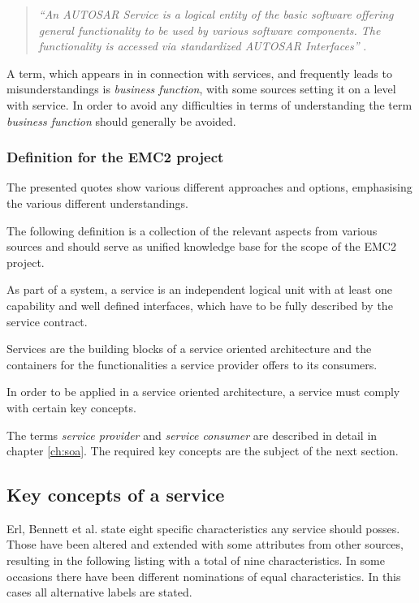 \begin{description}
\begin{quote}
\emph{``An AUTOSAR Service is a logical entity of the basic software offering general functionality to be used by various software components. The functionality is accessed via standardized AUTOSAR Interfaces''} \cite{autosar_glossary}.
\end{quote}

\end{description}

A term, which appears in in connection with services, and frequently leads to misunderstandings is \emph{business function}, with some sources setting it on a level with service. In order to avoid any difficulties in terms of understanding the term \emph{business function} should generally be avoided.

\subsubsection{Definition for the EMC2 project}
The presented quotes show various different approaches and options, emphasising the various different understandings.

The following definition is a collection of the relevant aspects from various sources and should serve as unified knowledge base for the scope of the EMC2 project.

\begin{myquote}
	As part of a system, a service is an independent logical unit with at least one capability and well defined interfaces, which have to be fully described by the service contract.

	Services are the building blocks of a service oriented architecture and the containers for the functionalities a service provider offers to its consumers.

	In order to be applied in a service oriented architecture, a service must comply with certain key concepts.
\end{myquote}

The terms \emph{service provider} and \emph{service consumer} are described in detail in chapter \ref{ch:soa}. The required key concepts are the subject of the next section.

\subsection{Key concepts of a service}
\label{sec:service-concepts}
Erl, Bennett et al. \cite[p.27]{erl2011} state eight specific characteristics any service should posses. Those have been altered and extended with some attributes from other sources, resulting in the following listing with a total of nine characteristics. In some occasions there have been different nominations of equal characteristics. In this cases all alternative labels are stated.

